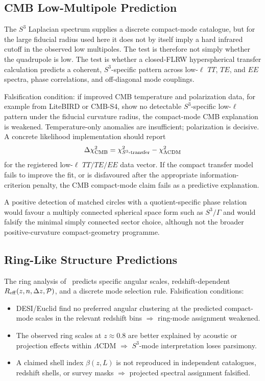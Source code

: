 \documentclass[aps,prd,onecolumn,superscriptaddress,longbibliography,nofootinbib,notitlepage]{revtex4-2}
\begin{document}
\subsection{CMB Low-Multipole Prediction}

The $S^3$ Laplacian spectrum supplies a discrete compact-mode catalogue, but for
the large fiducial radius used here it does not by itself imply a hard infrared
cutoff in the observed low multipoles. The test is therefore not simply whether
the quadrupole is low. The test is whether a closed-FLRW hyperspherical transfer
calculation predicts a coherent, $S^3$-specific pattern across low-$\ell$ $TT$,
$TE$, and $EE$ spectra, phase correlations, and off-diagonal mode couplings.

Falsification condition: if improved CMB temperature and polarization data, for
example from LiteBIRD or CMB-S4, show no detectable $S^3$-specific low-$\ell$
pattern under the fiducial curvature radius, the compact-mode CMB explanation is
weakened. Temperature-only anomalies are insufficient; polarization is decisive.
A concrete likelihood implementation should report
\begin{equation}
  \Delta\chi^2_{\rm CMB}
  =\chi^2_{S^3\text{-transfer}}-\chi^2_{\Lambda{\rm CDM}}
\end{equation}
for the registered low-$\ell$ $TT/TE/EE$ data vector. If the compact transfer
model fails to improve the fit, or is disfavoured after the appropriate
information-criterion penalty, the CMB compact-mode claim fails as a predictive
explanation.

A positive detection of matched circles with a quotient-specific phase relation
would favour a multiply connected spherical space form such as $S^3/\Gamma$ and
would falsify the minimal simply connected sector choice, although not the broader
positive-curvature compact-geometry programme.

\subsection{Ring-Like Structure Predictions}

The ring analysis of~\cite{Preece2026rings} predicts specific angular scales,
redshift-dependent $R_{\rm eff}(z,n,\Delta z,{\cal P})$, and a discrete mode
selection rule. Falsification conditions:
\begin{itemize}
  \item DESI/Euclid find no preferred angular clustering at the predicted
    compact-mode scales in the relevant redshift bins
    $\Rightarrow$ ring-mode assignment weakened.
  \item The observed ring scales at $z \approx 0.8$ are better explained by
    acoustic or projection effects within $\Lambda$CDM
    $\Rightarrow$ $S^3$-mode interpretation loses parsimony.
  \item A claimed shell index $\beta(z,L)$ is not reproduced in independent
    catalogues, redshift shells, or survey masks
    $\Rightarrow$ projected spectral assignment falsified.
\end{itemize}
\end{document}
